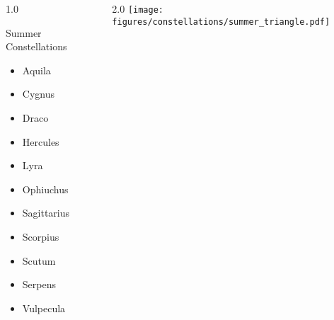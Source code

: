 \documentclass[final]{beamer}
\newlength{\colwidth}
\begin{document}
\begin{frame}[t]{}
  \begin{columns}[T]
    \begin{column}{1.0\colwidth}
      \Large
      \begin{block}{Summer Constellations}
        \begin{itemize}
          \item{Aquila}
          \item{Cygnus}
          \item{Draco}
          \item{Hercules}
          \item{Lyra}
          \item{Ophiuchus}
          \item{Sagittarius}
          \item{Scorpius}
          \item{Scutum}
          \item{Serpens}
          \item{Vulpecula}
        \end{itemize}
      \end{block}
    \end{column}
    \begin{column}{2.0\colwidth}
      \centering
      \texttt{[image: figures/constellations/summer\_triangle.pdf]}      \end{column}
  \end{columns}
\end{frame}

\end{document}
